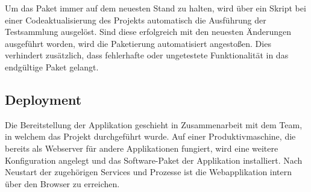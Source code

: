 Um das Paket immer auf dem neuesten Stand zu halten, wird über ein Skript bei einer
Codeaktualisierung des Projekts automatisch die Ausführung der Testsammlung ausgelöst.
Sind diese erfolgreich mit den neuesten Änderungen ausgeführt worden, wird die Paketierung
automatisiert angestoßen. Dies verhindert zusätzlich, dass fehlerhafte
oder ungetestete Funktionalität in das endgültige Paket gelangt.

\subsection{Deployment}
\label{sec:Deployment}
Die Bereitstellung der Applikation geschieht in Zusammenarbeit mit dem Team, in welchem das
Projekt durchgeführt wurde. Auf einer Produktivmaschine, die bereits als Webserver für
andere Applikationen fungiert, wird eine weitere Konfiguration angelegt und das Software-Paket der
Applikation installiert. Nach Neustart der zugehörigen Services und Prozesse ist die
Webapplikation intern über den Browser zu erreichen.
\pagebreak
